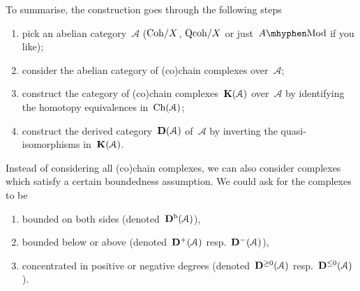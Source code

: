 \documentclass[10pt,a4paper]{article}
\begin{document}
To summarise, the construction goes through the following steps
\begin{enumerate}
  \item pick an abelian category~$\mathcal{A}$ ($\mathrm{Coh}/X$, $\mathrm{Qcoh}/X$ or just~$A\mhyphen\mathrm{Mod}$ if you like);
  \item consider the abelian category of (co)chain complexes over~$\mathcal{A}$;
  \item construct the category of (co)chain complexes~$\mathbf{K}(\mathcal{A})$ over~$\mathcal{A}$ by identifying the homotopy equivalences in~$\operatorname{Ch}(\mathcal{A})$;
  \item construct the derived category~$\mathbf{D}(\mathcal{A})$ of~$\mathcal{A}$ by inverting the quasi-isomorphisms in~$\mathbf{K}(\mathcal{A})$.
\end{enumerate}
Instead of considering all (co)chain complexes, we can also consider complexes which satisfy a certain boundedness assumption. We could ask for the complexes to be
\begin{enumerate}
  \item bounded on both sides (denoted~$\mathbf{D}^{\mathrm{b}}(\mathcal{A})$),
  \item bounded below or above (denoted~$\mathbf{D}^+(\mathcal{A})$ resp.\ $\mathbf{D}^-(\mathcal{A})$),
  \item concentrated in positive or negative degrees (denoted~$\mathbf{D}^{\geq 0}(\mathcal{A})$ resp.\ $\mathbf{D}^{\leq 0}(\mathcal{A})$).
\end{enumerate}






\printbibliography
\end{document}
